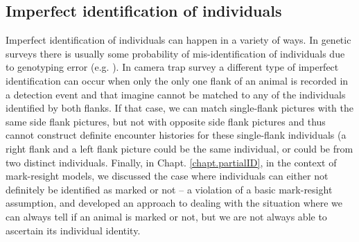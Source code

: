 \begin{table}[ht]
\subsection{Imperfect identification of individuals}

Imperfect identification of individuals can happen in a variety of
ways. In genetic surveys there is usually some probability of
mis-identification of individuals due to genotyping error
(e.g. \citet{lukacs_burnham:2005}). In camera trap survey a different
type of imperfect identification can occur when only the only one
flank of an animal is recorded in a detection event and that imagine
cannot be matched to any of the individuals identified by both
flanks. If that case, we can match single-flank pictures with the same
side flank pictures, but not with opposite side flank pictures and
thus cannot construct definite encounter histories for these
single-flank individuals (a right flank and a left flank picture could
be the same individual, or could be from two distinct
individuals. Finally, in Chapt. \ref{chapt.partialID}, in the context
of mark-resight models, we discussed the case where individuals can
either not definitely be identified as marked or not -- a violation of
a basic mark-resight assumption, and developed an approach to dealing
with the situation where we can always tell if an animal is marked or
not, but we are not always able to ascertain its individual identity.


\end{table}
